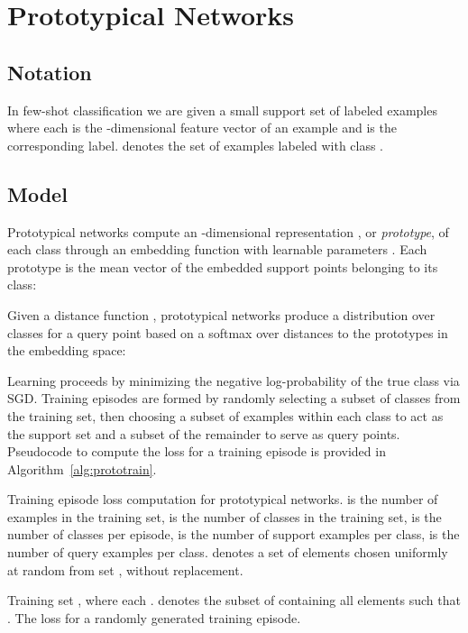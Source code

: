 \documentclass{article}
\begin{document}
\section{Prototypical Networks}
\subsection{Notation}
In few-shot classification we are given a small support set of  labeled examples  where each  is the -dimensional feature vector of an example and  is the corresponding label.  denotes the set of examples labeled with class .

\subsection{Model}
Prototypical networks compute an -dimensional representation , or \emph{prototype}, of each class through an embedding function  with  learnable parameters . Each prototype is the mean vector of the embedded support points belonging to its class:

Given a distance function , prototypical networks produce a distribution over classes for a query point  based on a softmax over distances to the prototypes in the embedding space:

Learning proceeds by minimizing the negative log-probability  of the true class  via SGD. Training episodes are formed by randomly selecting a subset of classes from the training set, then choosing a subset of examples within each class to act as the support set and a subset of the remainder to serve as query points. Pseudocode to compute the loss  for a training episode is provided in Algorithm~\ref{alg:prototrain}.

\begin{algorithm*}[tb]
    \caption{Training episode loss computation for prototypical networks.  is the number of examples in the training set,  is the number of classes in the training set,  is the number of classes per episode,  is the number of support examples per class,  is the number of query examples per class.  denotes a set of  elements chosen uniformly at random from set , without replacement.}
    \label{alg:prototrain}
    \begin{algorithmic}
    \REQUIRE Training set , where each .  denotes the subset of  containing all elements  
    such that . 
    \ENSURE The loss  for a randomly generated training episode.
    \STATE  
        \STATE  {}
        \STATE  {}
        \STATE  {}
    \ENDFOR
    \STATE  {}
            \STATE  {}
        \ENDFOR
    \ENDFOR
    \end{algorithmic}
\end{algorithm*}
\end{document}
